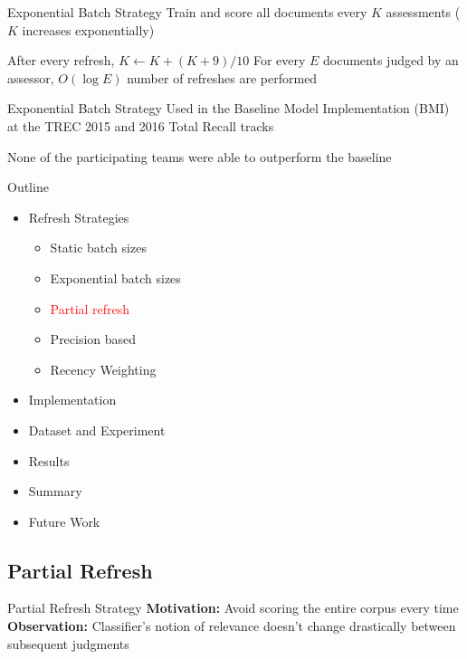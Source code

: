 \documentclass[14pt]{beamer}
\newcommand{\red}[1]{\textcolor{red}{#1}}
\begin{document}
\begin{frame}{Exponential Batch Strategy}
Train and score all documents every $K$ assessments ($K$ increases exponentially)

\vskip 1cm
After every refresh,
$K← K + (K + 9)/10$
\vskip 0.5cm
\pause
For every $E$ documents judged by an assessor, $O(\log E)$ number of refreshes
are performed
\end{frame}

\begin{frame}{Exponential Batch Strategy}
Used in the Baseline Model Implementation (BMI) at the TREC 2015 and 2016 Total
Recall tracks~\cite{roegiest2015trec,grossman2016trec}

\vskip 1cm
None of the participating teams were able to outperform the baseline

\end{frame}

\begin{frame}{Outline}
\begin{itemize}
    \item Refresh Strategies
    \begin{itemize}
        \item Static batch sizes
        \item Exponential batch sizes
        \item \red{Partial refresh}
        \item Precision based
        \item Recency Weighting
    \end{itemize}
    \item Implementation
    \item Dataset and Experiment
    \item Results
    \item Summary
    \item Future Work
\end{itemize}
\end{frame}

\subsection{Partial Refresh}
\begin{frame}{Partial Refresh Strategy}
    \textbf{Motivation:} Avoid scoring the entire corpus every time
\vskip 0.5cm
\textbf{Observation:} Classifier's notion of relevance doesn't change drastically between
subsequent judgments

\end{frame}
\end{document}
